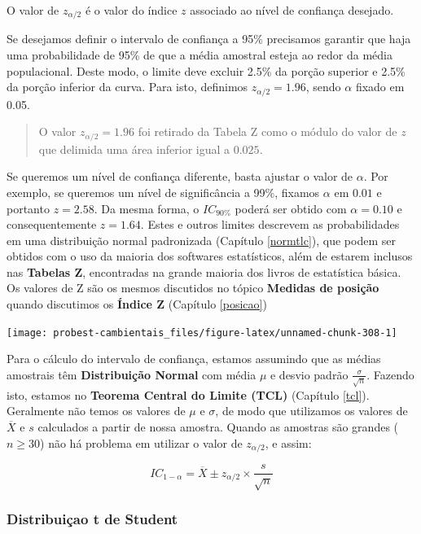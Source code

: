 \documentclass[
]{book}
\begin{document}
O valor de \(z_{\alpha/2}\) é o valor do índice \(z\) associado ao nível de confiança desejado.

Se desejamos definir o intervalo de confiança a 95\% precisamos garantir que haja uma probabilidade de 95\% de que a média amostral esteja ao redor da média populacional. Deste modo, o limite deve excluir 2.5\% da porção superior e 2.5\% da porção inferior da curva. Para isto, definimos \(z_{\alpha/2} = 1.96\), sendo \(\alpha\) fixado em 0.05.

\begin{quote}
O valor \(z_{\alpha/2} = 1.96\) foi retirado da Tabela Z como o módulo do valor de \(z\) que delimida uma área inferior igual a \(0.025\).
\end{quote}

Se queremos um nível de confiança diferente, basta ajustar o valor de \(\alpha\). Por exemplo, se queremos um nível de significância a 99\%, fixamos \(\alpha\) em \(0.01\) e portanto \(z = 2.58\). Da mesma forma, o \(IC_{90\%}\) poderá ser obtido com \(\alpha = 0.10\) e consequentemente \(z = 1.64\). Estes e outros limites descrevem as probabilidades em uma distribuição normal padronizada (Capítulo \ref{normtlc}), que podem ser obtidos com o uso da maioria dos softwares estatísticos, além de estarem inclusos nas \textbf{Tabelas Z}, encontradas na grande maioria dos livros de estatística básica. Os valores de Z são os mesmos discutidos no tópico \textbf{Medidas de posição} quando discutimos os \textbf{Índice Z} (Capítulo \ref{posicao})

\begin{center}\texttt{[image: probest-cambientais\_files/figure-latex/unnamed-chunk-308-1]} \end{center}

Para o cálculo do intervalo de confiança, estamos assumindo que as médias amostrais têm \textbf{Distribuição Normal} com média \(\mu\) e desvio padrão \(\frac{\sigma}{\sqrt{n}}\). Fazendo isto, estamos no \textbf{Teorema Central do Limite (TCL)} (Capítulo \ref{tcl}). Geralmente não temos os valores de \(\mu\) e \(\sigma\), de modo que utilizamos os valores de \(\overline{X}\) e \(s\) calculados a partir de nossa amostra. Quando as amostras são grandes (\(n\ge{30}\)) não há problema em utilizar o valor de \(z_{\alpha/2}\), e assim:

\[IC_{1-\alpha} = \overline{X} \pm z_{\alpha/2} \times \frac{s}{\sqrt{n}}\]

\hypertarget{distribuiuxe7ao-t-de-student}{%
\subsubsection{Distribuiçao t de Student}\label{distribuiuxe7ao-t-de-student}}
\end{document}
